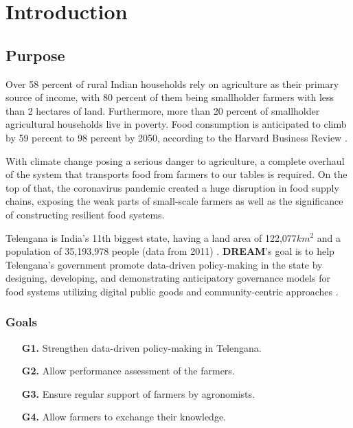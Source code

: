 \chapter{Introduction}

\section{Purpose}



Over 58 percent of rural Indian households rely on agriculture as their primary source of income, with 80 percent of them being smallholder farmers with less than 2 hectares of land. Furthermore, more than 20 percent of smallholder agricultural households live in poverty. Food consumption is anticipated to climb by 59 percent to 98 percent by 2050, according to the Harvard Business Review \cite{global_demand_for_food}.

With climate change posing a serious danger to agriculture, a complete overhaul of the system that transports food from farmers to our tables is required. On the top of that, the coronavirus pandemic created a huge disruption in food supply chains, exposing the weak parts of small-scale farmers as well as the significance of constructing resilient food systems.

Telengana is India's 11th biggest state, having a land area of 122,077$km^2$ and a population of 35,193,978 people (data from 2011) \cite{telengana}. \textbf{DREAM}'s goal is to help Telengana’s government promote data-driven policy-making in the state by designing, developing, and demonstrating anticipatory governance models for food systems utilizing digital public goods and community-centric approaches \cite{reference_doc}.

\subsection{Goals}
\begin{itemize}
    \item [\textbf{G1.}] Strengthen data-driven policy-making in Telengana.
    \item [\textbf{G2.}] Allow performance assessment of the farmers.
    \item [\textbf{G3.}] Ensure regular support of farmers by agronomists.
    \item [\textbf{G4.}] Allow farmers to exchange their knowledge.
\end{itemize}

